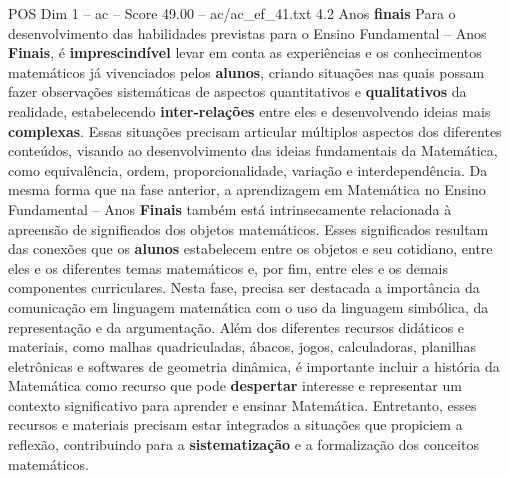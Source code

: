 \begin{textsample}{POS Dim 1 – ac – Score 49.00 – ac/ac\_ef\_41.txt}  \label{ex:f1_pos_174}
4.2 Anos \textbf{finais} Para o desenvolvimento das habilidades previstas para o Ensino Fundamental – Anos \textbf{Finais}, é \textbf{imprescindível} levar em conta as experiências e os conhecimentos matemáticos já vivenciados pelos \textbf{alunos}, criando situações nas quais possam fazer observações sistemáticas de aspectos quantitativos e \textbf{qualitativos} da realidade, estabelecendo \textbf{inter-relações} entre eles e desenvolvendo ideias mais \textbf{complexas}.
Essas situações precisam articular múltiplos aspectos dos diferentes conteúdos, visando ao desenvolvimento das ideias fundamentais da Matemática, como equivalência, ordem, proporcionalidade, variação e interdependência.
Da mesma forma que na fase anterior, a aprendizagem em Matemática no Ensino Fundamental – Anos \textbf{Finais} também está intrinsecamente relacionada à apreensão de significados dos objetos matemáticos.
Esses significados resultam das conexões que os \textbf{alunos} estabelecem entre os objetos e seu cotidiano, entre eles e os diferentes temas matemáticos e, por fim, entre eles e os demais componentes curriculares.
Nesta fase, precisa ser destacada a importância da comunicação em linguagem matemática com o uso da linguagem simbólica, da representação e da argumentação.
Além dos diferentes recursos didáticos e materiais, como malhas quadriculadas, ábacos, jogos, calculadoras, planilhas eletrônicas e softwares de geometria dinâmica, é importante incluir a história da Matemática como recurso que pode \textbf{despertar} interesse e representar um contexto significativo para aprender e ensinar Matemática.
Entretanto, esses recursos e materiais precisam estar integrados a situações que propiciem a reflexão, contribuindo para a \textbf{sistematização} e a formalização dos conceitos matemáticos.

\end{textsample}
